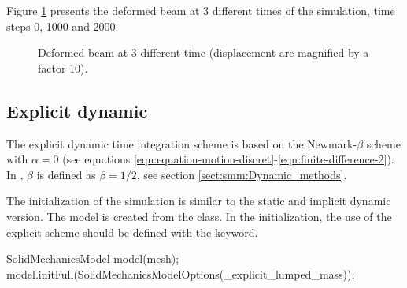 Figure \ref{fig:smm:implicit:dynamic_solution} presents the deformed
beam at 3 different times of the simulation, time steps 0, 1000 and
2000.

\begin{figure}[!htb] \centering \setlength{\unitlength}{0.1\textwidth}

  \caption{Deformed beam at 3 different time (displacement are
magnified by a factor 10).}
  \label{fig:smm:implicit:dynamic_solution}
\end{figure}

\subsection{Explicit dynamic}

The explicit dynamic time integration scheme is based on the
Newmark-$\beta$ scheme with $\alpha=0$ (see equations
\ref{eqn:equation-motion-discret}-\ref{eqn:finite-difference-2}).  In
\akantu, $\beta$ is defined as $\beta=1/2$, see section
\ref{sect:smm:Dynamic_methods}.

The initialization of the simulation is similar to the static and
implicit dynamic version.  The model is created from the
 class.  In the initialization, the use of
the explicit scheme should be defined with the
 keyword.

\begin{cpp} SolidMechanicsModel model(mesh);
model.initFull(SolidMechanicsModelOptions(_explicit_lumped_mass));
\end{cpp} 



